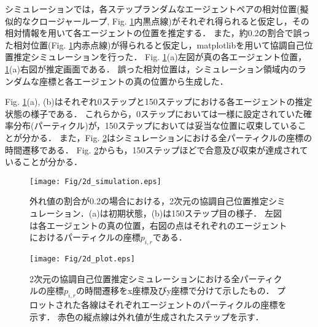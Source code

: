 \documentclass[a4paper,fleqn,10pt,twocolumn]{SICE_ISCS}
\begin{document}
シミュレーションでは，各ステップランダムなエージェントペアの相対位置(擬似的なクロージャーループ, Fig. \ref{fig:simulation_1_step_0}内黒点線)がそれぞれ得られると仮定し，その相対情報を用いて各エージェントの位置を推定する．
また，約0.2の割合で誤った相対位置(Fig. \ref{fig:simulation_1_step_0}内赤点線)が得られると仮定し，matplotlibを用いて協調自己位置推定シミュレーションを行った．
Fig. \ref{fig:simulation_1_step_0}(a)左図が真の各エージェント位置，\ref{fig:simulation_1_step_0}(a)右図が推定画面である．
誤った相対位置は，シミュレーション領域内のランダムな座標と各エージェントの真の位置から生成した．

Fig. \ref{fig:simulation_1_step_0}(a), (b)はそれぞれ0ステップと150ステップにおける各エージェントの推定状態の様子である．
これらから，0ステップにおいては一様に設定されていた確率分布(パーティクル)が，150ステップにおいては妥当な位置に収束していることが分かる．
また，Fig. \ref{fig:plot_1}はシミュレーションにおける全パーティクルの座標の時間遷移である．
Fig. \ref{fig:plot_1}からも，150ステップほどで合意及び収束が達成されていることが分かる．

\begin{figure}[t]
	\begin{center}
		\texttt{[image: Fig/2d\_simulation.eps]}
		\caption{外れ値の割合が0.2の場合における，2次元の協調自己位置推定シミュレーション．(a)は初期状態，(b)は150ステップ目の様子．
    左図は各エージェントの真の位置，右図の点はそれぞれのエージェントにおけるパーティクルの座標$p_{i,r}$である．}
		\label{fig:simulation_1_step_0}
	\end{center}
	\vspace{-2mm}
\end{figure}


\begin{figure}[t]
	\begin{center}
		\texttt{[image: Fig/2d\_plot.eps]}
		\caption{2次元の協調自己位置推定シミュレーションにおける全パーティクルの座標$p_{i,r}$の時間遷移をx座標及びy座標で分けて示したもの．
    プロットされた各線はそれぞれエージェントのパーティクルの座標を示す．
    赤色の縦点線は外れ値が生成されたステップを示す．}
		\label{fig:plot_1}
	\end{center}
	\vspace{-2mm}
\end{figure}
\end{document}

